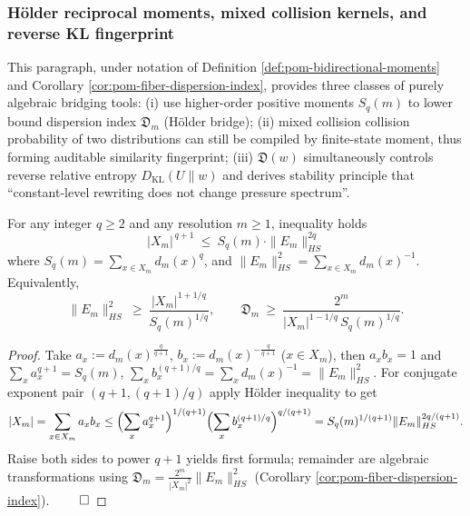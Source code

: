 \subsubsection{Hölder reciprocal moments, mixed collision kernels, and reverse KL fingerprint}\label{subsubsec:pom-hoelder-mixed-kl-bridge}
This paragraph, under notation of Definition \ref{def:pom-bidirectional-moments} and Corollary \ref{cor:pom-fiber-dispersion-index},
provides three classes of purely algebraic bridging tools:
(i) use higher-order positive moments \(S_q(m)\) to lower bound dispersion index \(\mathfrak{D}_m\) (Hölder bridge);
(ii) mixed collision collision probability of two distributions can still be compiled by finite-state moment, thus forming auditable similarity fingerprint;
(iii) \(\mathfrak{D}(w)\) simultaneously controls reverse relative entropy \(D_{\mathrm{KL}}(U\|w)\) and derives stability principle that ``constant-level rewriting does not change pressure spectrum''.

\begin{proposition}\label{prop:pom-hoelder-bridge-dispersion-from-Sq}
For any integer \(q\ge 2\) and any resolution \(m\ge 1\), inequality holds
\[
\boxed{\;
|X_m|^{\,q+1}\ \le\ S_q(m)\cdot \|E_m\|_{HS}^{2q}\;}
\]
where \(S_q(m)=\sum_{x\in X_m}d_m(x)^q\), and \(\|E_m\|_{HS}^2=\sum_{x\in X_m}d_m(x)^{-1}\).
Equivalently,
\[
\|E_m\|_{HS}^2\ \ge\ \frac{|X_m|^{1+1/q}}{S_q(m)^{1/q}},
\qquad
\mathfrak{D}_m\ \ge\ \frac{2^m}{|X_m|^{1-1/q}\,S_q(m)^{1/q}}.
\]
\end{proposition}
\begin{proof}
Take
\(
a_x:=d_m(x)^{\frac{q}{q+1}}
\),
\(
b_x:=d_m(x)^{-\frac{q}{q+1}}
\)
(\(x\in X_m\)), then \(a_xb_x=1\) and
\(
\sum_x a_x^{q+1}=S_q(m)
\), \(
\sum_x b_x^{(q+1)/q}=\sum_x d_m(x)^{-1}=\|E_m\|_{HS}^2
\).
For conjugate exponent pair \((q+1,(q+1)/q)\) apply Hölder inequality to get
\[
|X_m|
=\sum_{x\in X_m}a_xb_x
\le
\Bigl(\sum_x a_x^{q+1}\Bigr)^{1/(q+1)}
\Bigl(\sum_x b_x^{(q+1)/q}\Bigr)^{q/(q+1)}
=S_q(m)^{1/(q+1)}\|E_m\|_{HS}^{2q/(q+1)}.
\]
Raise both sides to power \(q+1\) yields first formula; remainder are algebraic transformations using \(\mathfrak{D}_m=\frac{2^m}{|X_m|^2}\|E_m\|_{HS}^2\) (Corollary \ref{cor:pom-fiber-dispersion-index}). $\qed$
\end{proof}

